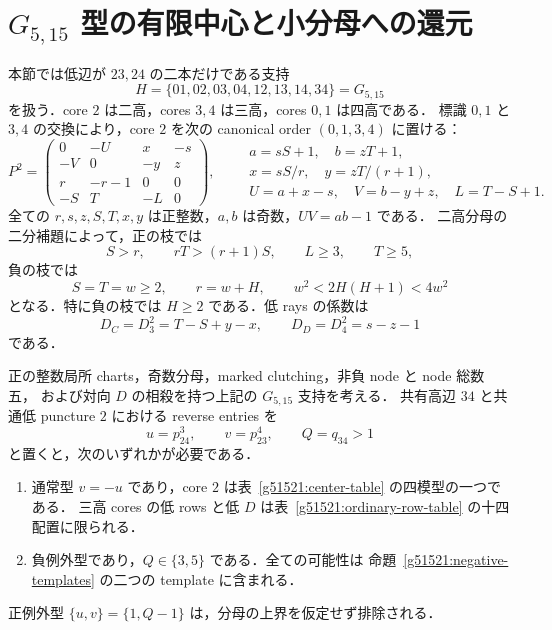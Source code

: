 \section{\texorpdfstring{$G_{5,15}$}{G5,15} 型の有限中心と小分母への還元}
\label{g51521:section}

本節では低辺が $23,24$ の二本だけである支持
\[
 H=\{01,02,03,04,12,13,14,34\}=G_{5,15}
\]
を扱う．core $2$ は二高，cores $3,4$ は三高，cores $0,1$ は四高である．
標識 $0,1$ と $3,4$ の交換により，core $2$ を次の canonical order $(0,1,3,4)$ に置ける：
\begin{equation}\label{g51521:central}
 P^2=\begin{pmatrix}
 0&-U&x&-s\\
 -V&0&-y&z\\
 r&-r-1&0&0\\
 -S&T&-L&0
 \end{pmatrix},\qquad
 \begin{gathered}
 a=sS+1,\quad b=zT+1,\\
 x=sS/r,\quad y=zT/(r+1),\\
 U=a+x-s,\quad V=b-y+z,\quad L=T-S+1.
 \end{gathered}
\end{equation}
全ての $r,s,z,S,T,x,y$ は正整数，$a,b$ は奇数，$UV=ab-1$ である．
二高分母の二分補題によって，正の枝では
\begin{equation}\label{g51521:positive-central}
 S>r,\qquad rT>(r+1)S,\qquad L\ge3,\qquad T\ge5,
\end{equation}
負の枝では
\begin{equation}\label{g51521:negative-central}
 S=T=w\ge2,\qquad r=w+H,\qquad
 w^2<2H(H+1)<4w^2
\end{equation}
となる．特に負の枝では $H\ge2$ である．低 rays の係数は
\begin{equation}\label{g51521:low-D}
 D_C=D^2_3=T-S+y-x,\qquad D_D=D^2_4=s-z-1
\end{equation}
である．

\begin{theorem}
\label{g51521:reduction}
正の整数局所 charts，奇数分母，marked clutching，非負 node と node 総数五，
および対向 $D$ の相殺を持つ上記の $G_{5,15}$ 支持を考える．
共有高辺 $34$ と共通低 puncture $2$ における reverse entries を
\[
 u=p^3_{24},\qquad v=p^4_{23},\qquad Q=q_{34}>1
\]
と置くと，次のいずれかが必要である．
\begin{enumerate}
\item 通常型 $v=-u$ であり，core $2$ は表~\ref{g51521:center-table} の四模型の一つである．
三高 cores の低 rows と低 $D$ は表~\ref{g51521:ordinary-row-table} の十四配置に限られる．
\item 負例外型であり，$Q\in\{3,5\}$ である．全ての可能性は
命題~\ref{g51521:negative-templates} の二つの template に含まれる．
\end{enumerate}
正例外型 $\{u,v\}=\{1,Q-1\}$ は，分母の上界を仮定せず排除される．
\end{theorem}

